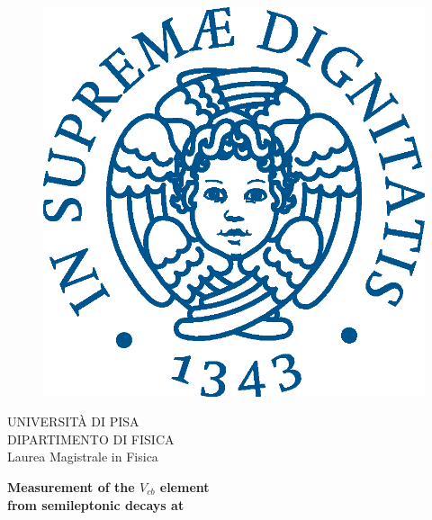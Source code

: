 
\begin{titlepage}

    \begin{figure}[!htb]
    \vspace{30mm}
        \centering
        \includegraphics[keepaspectratio=true,scale=0.5]{fig/Frontespizio/cherubinFrontespizio.eps}
    \end{figure}


\begin{center}
    \LARGE{UNIVERSITÀ DI PISA}
    \vspace{5mm}
    \\ \large{DIPARTIMENTO DI FISICA}
    \vspace{5mm}
    \\ \LARGE{Laurea Magistrale in Fisica}
\end{center}

\vspace{15mm}
\begin{center}
    {\LARGE{\textbf{Measurement of the $V_{cb}$ \CKM element}\\ \vspace{3mm} \textbf{from \PQt \PAQt semileptonic decays at \CMS} }}
    
    

\end{center}
\end{titlepage}
